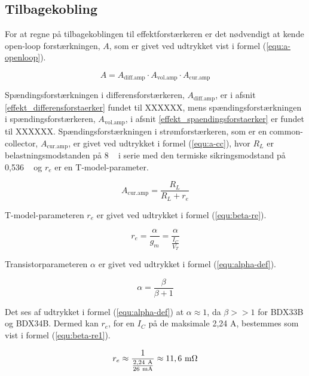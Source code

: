 \subsection{Tilbagekobling}
\label{effekt_tilbagekobling}
For at regne på tilbagekoblingen til effektforstærkeren er det nødvendigt at kende open-loop forstærkningen, $A$, som er givet ved udtrykket vist i formel (\ref{equ:a-openloop}).

\begin{equation}
\label{equ:a-openloop}
A = A_\mathrm{diff.amp} \cdot A_\mathrm{vol.amp} \cdot A_\mathrm{cur.amp}
\end{equation}

Spændingsforstærkningen i differensforstærkeren, $A_\mathrm{diff.amp}$, er i afsnit \ref{effekt_differensforstaerker} fundet til XXXXXX, mens spændingsforstærkningen i spændingsforstærkeren, $A_\mathrm{vol.amp}$, i afsnit \ref{effekt_spaendingsforstaerker} er fundet til XXXXXX. Spændingsforstærkningen i strømforstærkeren, som er en common-collector, $A_\mathrm{cur.amp}$, er givet ved udtrykket i formel (\ref{equ:a-cc}), hvor $R_L$ er belastningsmodstanden på 8 \ohm~ i serie med den termiske sikringsmodstand på 0,536 \ohm~ og $r_e$ er en T-model-parameter.

\begin{equation}
\label{equ:a-cc}
A_\mathrm{cur.amp} = \frac{R_L}{R_L+r_e}
\end{equation}

T-model-parameteren $r_e$ er givet ved udtrykket i formel (\ref{equ:beta-re}).

\begin{equation}
\label{equ:beta-re}
r_e = \frac{\alpha}{g_m} = \frac{\alpha}{\frac{I_C}{V_T}}
\end{equation}

Transistorparameteren $\alpha$ er givet ved udtrykket i formel (\ref{equ:alpha-def}).

\begin{equation}
\label{equ:alpha-def}
\alpha = \frac{\beta}{\beta + 1}
\end{equation}

Det ses af udtrykket i formel (\ref{equ:alpha-def}) at $\alpha \approx 1$, da $\beta>>1$ for BDX33B og BDX34B. Dermed kan $r_e$, for en $I_C$ på de maksimale 2,24 A, bestemmes som vist i formel (\ref{equ:beta-re1}).

\begin{equation}
\label{equ:beta-re1}
r_e \approx \frac{1}{\frac{\mathrm{2,24~A}}{\mathrm{26~mA}}} \approx \mathrm{11,6~m\ohm}
\end{equation}

